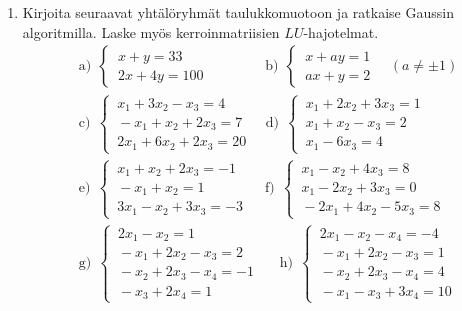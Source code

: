 \Harj
\begin{enumerate}


\item
Kirjoita seuraavat yhtälöryhmät taulukkomuotoon ja ratkaise Gaussin algoritmilla. Laske myös
kerroinmatriisien $LU$-hajotelmat.
\begin{align*}
&\text{a)}\ \ \begin{cases} \,x+y=33 \\ \,2x+4y=100 \end{cases} \qquad\qquad
 \text{b)}\ \ \begin{cases} \,x+ay=1 \\ \,ax+y=2 \end{cases} \quad (a \neq \pm 1) \\[2mm]
&\text{c)}\ \ \begin{cases} 
              \,x_1+3x_2-x_3=4 \\ \,-x_1+x_2+2x_3=7 \\ \,2x_1+6x_2+2x_3=20
              \end{cases} \quad
 \text{d)}\ \ \begin{cases}
              \,x_1+2x_2+3x_3=1 \\ \,x_1+x_2-x_3=2 \\ \,x_1-6x_3=4
              \end{cases} \\[2mm]
&\text{e)}\ \ \begin{cases} 
              \,x_1+x_2+2x_3=-1 \\ \,-x_1+x_2=1 \\ \,3x_1-x_2+3x_3=-3
              \end{cases} \quad\,
 \text{f)}\ \ \begin{cases}
              \,x_1-x_2+4x_3=8 \\ \,x_1-2x_2+3x_3=0 \\ \,-2x_1+4x_2-5x_3=8
              \end{cases} \\[2mm]
&\text{g)}\ \ \begin{cases}
              \,2x_1-x_2=1 \\ \,-x_1+2x_2-x_3=2 \\ \,-x_2+2x_3-x_4=-1 \\ \,-x_3+2x_4=1
              \end{cases} \quad\ \
 \text{h)}\ \ \begin{cases}
              \,2x_1-x_2-x_4=-4 \\ \,-x_1+2x_2-x_3=1 \\ \,-x_2+2x_3-x_4=4 \\ \,-x_1-x_3+3x_4=10
              \end{cases}
\end{align*}


\end{enumerate}
